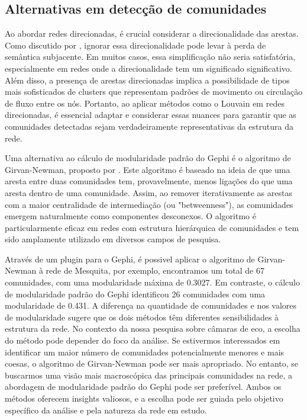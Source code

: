 \subsection*{Alternativas em detecção de comunidades}

Ao abordar redes direcionadas, é crucial considerar a direcionalidade das arestas. Como discutido por , ignorar essa direcionalidade pode levar à perda de semântica subjacente. Em muitos casos, essa simplificação não seria satisfatória, especialmente em redes onde a direcionalidade tem um significado significativo. Além disso, a presença de arestas direcionadas implica a possibilidade de tipos mais sofisticados de clusters que representam padrões de movimento ou circulação de fluxo entre os nós. Portanto, ao aplicar métodos como o Louvain em redes direcionadas, é essencial adaptar e considerar essas nuances para garantir que as comunidades detectadas sejam verdadeiramente representativas da estrutura da rede.

Uma alternativa ao cálculo de modularidade padrão do Gephi é o algoritmo de Girvan-Newman, proposto por \cite{2002_Girvan}. Este algoritmo é baseado na ideia de que uma aresta entre duas comunidades tem, provavelmente, menos ligações do que uma aresta dentro de uma comunidade. Assim, ao remover iterativamente as arestas com a maior centralidade de intermediação (ou "betweenness"), as comunidades emergem naturalmente como componentes desconexos. O algoritmo é particularmente eficaz em redes com estrutura hierárquica de comunidades e tem sido amplamente utilizado em diversos campos de pesquisa.

Através de um plugin para o Gephi, é possivel aplicar o algoritmo de Girvan-Newman à rede de Mesquita, por exemplo, encontramos um total de 67 comunidades, com uma modularidade máxima de 0.3027. Em contraste, o cálculo de modularidade padrão do Gephi identificou 26 comunidades com uma modularidade de 0.431. A diferença na quantidade de comunidades e nos valores de modularidade sugere que os dois métodos têm diferentes sensibilidades à estrutura da rede. No contexto da nossa pesquisa sobre câmaras de eco, a escolha do método pode depender do foco da análise. Se estivermos interessados em identificar um maior número de comunidades potencialmente menores e mais coesas, o algoritmo de Girvan-Newman pode ser mais apropriado. No entanto, se buscarmos uma visão mais macroscópica das principais comunidades na rede, a abordagem de modularidade padrão do Gephi pode ser preferível. Ambos os métodos oferecem insights valiosos, e a escolha pode ser guiada pelo objetivo específico da análise e pela natureza da rede em estudo.

